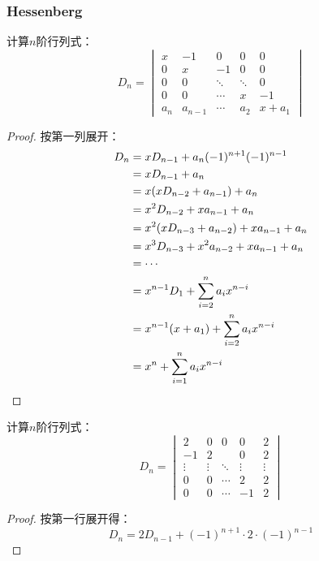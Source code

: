 \subsubsection{Hessenberg}
\begin{theorem}
	计算$n$阶行列式：
	\begin{equation*}
		D_n=
		\begin{vmatrix}
			x & -1 & 0 & 0 & 0 \\
			0 & x & -1 & 0 & 0 \\
			0 & 0 & \ddots & \ddots & 0 \\
			0 & 0 & \cdots & x & -1 \\
			a_n & a_{n-1} & \cdots & a_2 & x+a_1
		\end{vmatrix}
	\end{equation*}
\end{theorem}
\begin{proof}
	按第一列展开：
	\begin{align*}
		D_n
		&=xD_{n-1}+a_n(-1)^{n+1}(-1)^{n-1} \\
		&=xD_{n-1}+a_n \\
		&=x(xD_{n-2}+a_{n-1})+a_n \\
		&=x^2D_{n-2}+xa_{n-1}+a_n \\
		&=x^2(xD_{n-3}+a_{n-2})+xa_{n-1}+a_n \\
		&=x^3D_{n-3}+x^2a_{n-2}+xa_{n-1}+a_n \\
		&=\cdots \\
		&=x^{n-1}D_1+\sum_{i=2}^{n}a_ix^{n-i} \\
		&=x^{n-1}(x+a_1)+\sum_{i=2}^{n}a_ix^{n-i} \\
		&=x^n+\sum_{i=1}^{n}a_ix^{n-i}\qedhere
	\end{align*}
\end{proof}
\begin{theorem}
	计算$n$阶行列式：
	\begin{equation*}
		D_n=
		\begin{vmatrix}
			2 & 0 & 0 & 0 & 2 \\
			-1 & 2 &  & 0 & 2 \\
			\vdots & \vdots & \ddots & \vdots & \vdots \\
			0 & 0 & \cdots & 2 & 2 \\
			0 & 0 & \cdots & -1 & 2
		\end{vmatrix}
	\end{equation*}
\end{theorem}
\begin{proof}
	按第一行展开得：
	\begin{equation*}
		D_n=2D_{n-1}+(-1)^{n+1}\cdot2\cdot(-1)^{n-1}
	\end{equation*}
\end{proof}
